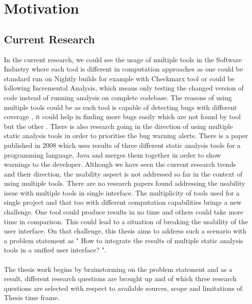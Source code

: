\chapter{Motivation}
\label{ch:motivation}

\section{Current Research}

In the current research, we could see the usage of multiple tools in the Software Industry where each tool is different in computation approaches as one could be standard run on Nightly builds for example with Checkmarx \cite{checkmarx} tool or could be following Incremental Analysis, which means only testing the changed version of code instead of running analysis on complete codebase. The reasons of using multiple tools could be as each tool is capable of detecting bugs with different coverage \cite{bessey2010few} \cite{delaitre2015evaluating}, it could help in finding more bugs easily which are not found by tool but the other \cite{plakosh2014improving}. There is also research \cite{flynn2018prioritizing} going in the direction of using multiple static analysis tools in order to prioritise the bug warning alerts. There is a paper \cite{meng2008approach} published in 2008 which uses results of three different static analysis tools for a programming language, Java and merges them together in order to show warnings to the developer. 
Although we have seen the current research trends and their direction, the usability aspect is not addressed so far in the context of using multiple tools. There are no research papers found addressing the usability issue with multiple tools in single interface. The multiplicity of tools used for a single project and that too with different computation capabilities brings a new challenge.  One tool could produce results in no time and others could take more time in comparison. This could lead to a situation of breaking the usability of the user interface. On that challenge, this thesis aims to address such a scenario with a problem statement as " How to integrate the results of multiple static analysis tools in a unified user interface? ".  \\ \\

The thesis work begins by brainstorming on the problem statement and as a result, different research questions are brought up and of which three research questions are selected with respect to available sources, scope and limitations of Thesis time frame. \\ \\

